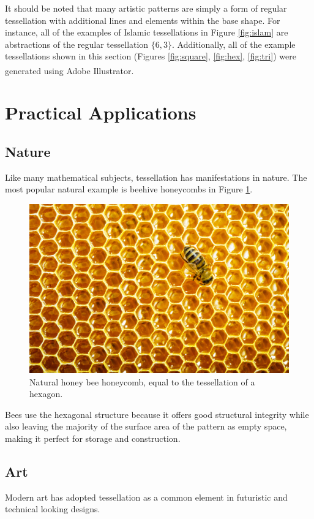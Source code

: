 \documentclass[12pt,letterpaper]{article}
\begin{document}
It should be noted that many artistic patterns are simply a form of regular tessellation with additional lines and elements within the base shape. For instance, all of the examples of Islamic tessellations in Figure \ref{fig:islam} are abstractions of the regular tessellation $\{6,3\}$. Additionally, all of the example tessellations shown in this section (Figures \ref{fig:square}, \ref{fig:hex}, \ref{fig:tri}) were generated using Adobe Illustrator\textsuperscript{\textregistered}.

\section{Practical Applications}

\subsection{Nature}
Like many mathematical subjects, tessellation has manifestations in nature. The most popular natural example is beehive honeycombs in Figure \ref{fig:bee}.

\begin{figure}[H]
    \begin{center}
        \includegraphics[width=.6\linewidth]{honeycomb}
                \caption{Natural honey bee honeycomb, equal to the tessellation of a hexagon.}
                \label{fig:bee}
    \end{center}
\end{figure}

Bees use the hexagonal structure because it offers good structural integrity while also leaving the majority of the surface area of the pattern as empty space, making it perfect for storage and construction. 

\subsection{Art}
Modern art has adopted tessellation as a common element in futuristic and technical looking designs.
\end{document}
